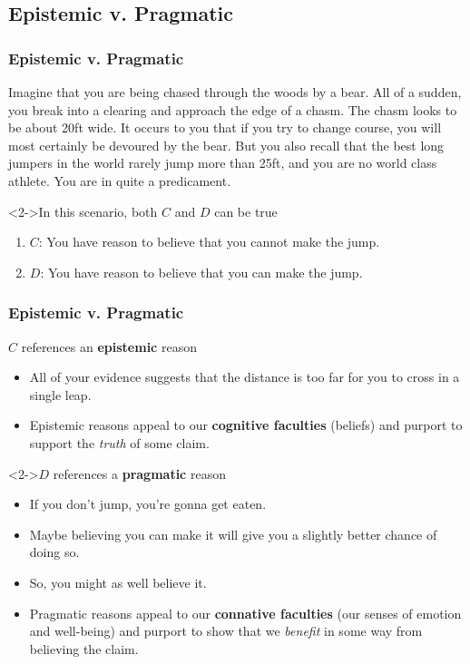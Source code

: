 \documentclass[10pt,letterpaper,xcolor=dvipsnames,handout]{beamer}
\begin{document}
\subsection{Epistemic v. Pragmatic}

\begin{frame}
\frametitle{Epistemic v. Pragmatic}

Imagine that you are being chased through the woods by a bear.  All of a sudden, you break into a clearing and approach the edge of a chasm.  The chasm looks to be about 20ft wide. It occurs to you that if you try to change course, you will most certainly be devoured by the bear.  But you also recall that the best long jumpers in the world rarely jump more than 25ft, and you are no world class athlete. You are in quite a predicament.

\begin{block}<2->{In this scenario, both $C$ and $D$ can be true}
  \begin{enumerate}[$\rightharpoonup$]
    \item $C$: You have reason to believe that you cannot make the jump.
    \item $D$: You have reason to believe that you can make the jump.
  \end{enumerate}
  
\end{block}

\end{frame}

\begin{frame}
\frametitle{Epistemic v. Pragmatic}

\begin{block}{$C$ references an \textbf{epistemic} reason}
  \begin{itemize}
    \item All of your evidence suggests that the distance is too far for you to cross in a single leap. 
    \item Epistemic reasons appeal to our \textbf{cognitive faculties} (beliefs) and purport to support the \textit{truth} of some claim.
  \end{itemize}
\end{block}

\begin{block}<2->{$D$ references a \textbf{pragmatic} reason}
  \begin{itemize}
    \item If you don't jump, you're gonna get eaten.  
    \item Maybe believing you can make it will give you a slightly better chance of doing so. 
    \item So, you might as well believe it. 
    \item Pragmatic reasons appeal to our \textbf{connative faculties} (our senses of emotion and well-being) and purport to show that we \textit{benefit} in some way from believing the claim.
  \end{itemize}
\end{block}

\end{frame}
\end{document}
